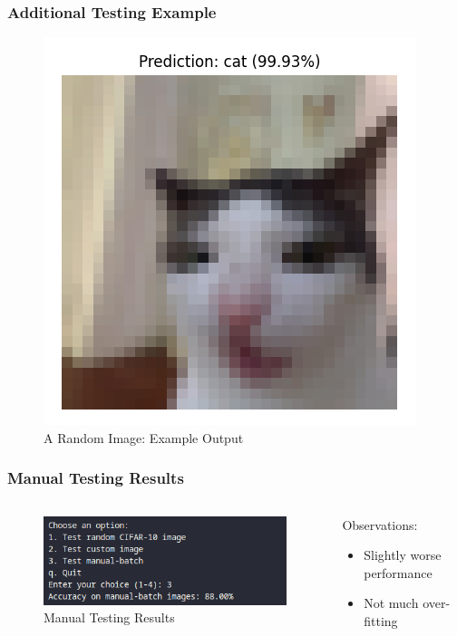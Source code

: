 \documentclass{beamer}
\begin{document}
\begin{frame}
    \frametitle{Additional Testing Example}
    \begin{figure}
        \centering
        \includegraphics[height=0.7\textheight]{media/custom_image.png}
        \vspace{-0.3cm}
        \caption{A Random Image: Example Output}
    \end{figure}
\end{frame}

\begin{frame}
\frametitle{Manual Testing Results}
\begin{columns}
    \begin{column}{0.5\textwidth}
        \begin{figure}
            \centering
            \includegraphics[width=1\textwidth]{media/manual_batch.png}
            \caption{Manual Testing Results}
        \end{figure}
    \end{column}

    \begin{column}{0.5\textwidth}
        Observations:
        \begin{itemize}
            \item Slightly worse performance 
            \item Not much over-fitting
        \end{itemize}
    \end{column}
\end{columns}
\end{frame}
\end{document}
